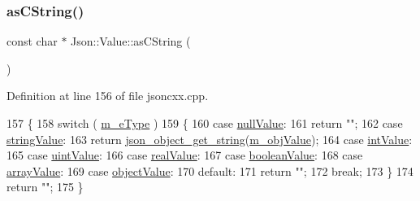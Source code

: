 \subsubsection{\texorpdfstring{as\+C\+String()}{asCString()}}
{\footnotesize\ttfamily const char $\ast$ Json\+::\+Value\+::as\+C\+String (\begin{DoxyParamCaption}{ }\end{DoxyParamCaption})}



Definition at line 156 of file jsoncxx.\+cpp.


\begin{DoxyCode}
157     \{
158         \textcolor{keywordflow}{switch} ( \hyperlink{class_json_1_1_value_ae6116e08a5c1833f858c1d29156365b1}{m\_eType} )
159         \{
160         \textcolor{keywordflow}{case} \hyperlink{namespace_json_a7d654b75c16a57007925868e38212b4ea7d9899633b4409bd3fc107e6737f8391}{nullValue}:
161             \textcolor{keywordflow}{return} \textcolor{stringliteral}{""};
162         \textcolor{keywordflow}{case} \hyperlink{namespace_json_a7d654b75c16a57007925868e38212b4ea804ef857affea2d415843c73f261c258}{stringValue}:
163             \textcolor{keywordflow}{return} \hyperlink{json__object_8c_a48160f5bba7d298343045d2daca5e07a}{json\_object\_get\_string}(\hyperlink{class_json_1_1_value_a3a705e06c2dbc4a6e142b58b0cbca57e}{m\_objValue});
164         \textcolor{keywordflow}{case} \hyperlink{namespace_json_a7d654b75c16a57007925868e38212b4eae5a9d708d5c9e23ae9bf98898522512d}{intValue}:
165         \textcolor{keywordflow}{case} \hyperlink{namespace_json_a7d654b75c16a57007925868e38212b4eaea788d9a3bb00adc6d68d97d43e1ccd3}{uintValue}:
166         \textcolor{keywordflow}{case} \hyperlink{namespace_json_a7d654b75c16a57007925868e38212b4eab837c7b869c14d8be712deb45c9e490e}{realValue}:
167         \textcolor{keywordflow}{case} \hyperlink{namespace_json_a7d654b75c16a57007925868e38212b4ea14c30dbf4da86f7b809be299f671f7fd}{booleanValue}:
168         \textcolor{keywordflow}{case} \hyperlink{namespace_json_a7d654b75c16a57007925868e38212b4eadc8f264f36b55b063c78126b335415f4}{arrayValue}:
169         \textcolor{keywordflow}{case} \hyperlink{namespace_json_a7d654b75c16a57007925868e38212b4eae8386dcfc36d1ae897745f7b4f77a1f6}{objectValue}:
170         \textcolor{keywordflow}{default}:
171             \textcolor{keywordflow}{return} \textcolor{stringliteral}{""};
172             \textcolor{keywordflow}{break};
173         \}
174         \textcolor{keywordflow}{return} \textcolor{stringliteral}{""};
175     \}
\end{DoxyCode}
\mbox{\label{class_json_1_1_value_afd24002a18aef907ad746b1cb9eda0a2}} 
